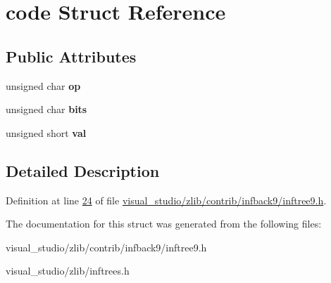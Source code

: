\hypertarget{structcode}{}\section{code Struct Reference}
\label{structcode}
\subsection*{Public Attributes}
\begin{DoxyCompactItemize}
\item 
\mbox{\label{structcode_a4f075d73a9177d05cc7d332105295b83}} 
unsigned char {\bfseries op}
\item 
\mbox{\label{structcode_a5defcebb356dca1a5a8d39995f28d66b}} 
unsigned char {\bfseries bits}
\item 
\mbox{\label{structcode_a6f9c73627997e8fc6df02e620cf9a6f5}} 
unsigned short {\bfseries val}
\end{DoxyCompactItemize}


\subsection{Detailed Description}


Definition at line \hyperlink{visual__studio_2zlib_2contrib_2infback9_2inftree9_8h_source_l00024}{24} of file \hyperlink{visual__studio_2zlib_2contrib_2infback9_2inftree9_8h_source}{visual\+\_\+studio/zlib/contrib/infback9/inftree9.\+h}.



The documentation for this struct was generated from the following files\+:\begin{DoxyCompactItemize}
\item 
visual\+\_\+studio/zlib/contrib/infback9/inftree9.\+h\item 
visual\+\_\+studio/zlib/inftrees.\+h\end{DoxyCompactItemize}
